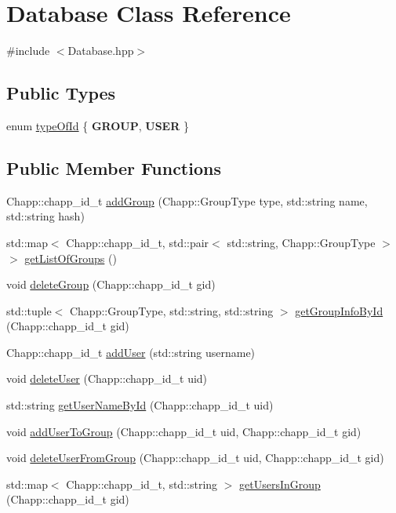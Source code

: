 \hypertarget{class_database}{}\section{Database Class Reference}
\label{class_database}


{\ttfamily \#include $<$Database.\+hpp$>$}

\subsection*{Public Types}
\begin{DoxyCompactItemize}
\item 
enum \hyperlink{class_database_ad32ccd24dab0b01d6d932b17a98a8695}{type\+Of\+Id} \{ {\bfseries G\+R\+O\+UP}, 
{\bfseries U\+S\+ER}
 \}
\end{DoxyCompactItemize}
\subsection*{Public Member Functions}
\begin{DoxyCompactItemize}
\item 
Chapp\+::chapp\+\_\+id\+\_\+t \hyperlink{class_database_a282bee9ff58e4c3e554552de4087f5ac}{add\+Group} (Chapp\+::\+Group\+Type type, std\+::string name, std\+::string hash)
\item 
std\+::map$<$ Chapp\+::chapp\+\_\+id\+\_\+t, std\+::pair$<$ std\+::string, Chapp\+::\+Group\+Type $>$ $>$ \hyperlink{class_database_a286f48b8af7fa66023c6aba1b3e73127}{get\+List\+Of\+Groups} ()
\item 
void \hyperlink{class_database_a680206c34e9a5ddebda18e05a3f82529}{delete\+Group} (Chapp\+::chapp\+\_\+id\+\_\+t gid)
\item 
std\+::tuple$<$ Chapp\+::\+Group\+Type, std\+::string, std\+::string $>$ \hyperlink{class_database_a5a5714804e40ee468b2e5f1bccf8dc69}{get\+Group\+Info\+By\+Id} (Chapp\+::chapp\+\_\+id\+\_\+t gid)
\item 
Chapp\+::chapp\+\_\+id\+\_\+t \hyperlink{class_database_ad55a1036c3276f4220f0f63f72b0dce2}{add\+User} (std\+::string username)
\item 
void \hyperlink{class_database_a1736f6c7fc8132b793568924e857bfe2}{delete\+User} (Chapp\+::chapp\+\_\+id\+\_\+t uid)
\item 
std\+::string \hyperlink{class_database_a11c428536c444314610396754abc07bb}{get\+User\+Name\+By\+Id} (Chapp\+::chapp\+\_\+id\+\_\+t uid)
\item 
void \hyperlink{class_database_a7ab1f3d3cb8d2ca36e4fb6d749974868}{add\+User\+To\+Group} (Chapp\+::chapp\+\_\+id\+\_\+t uid, Chapp\+::chapp\+\_\+id\+\_\+t gid)
\item 
void \hyperlink{class_database_a63af1a2a95bffd362f7d35746758d856}{delete\+User\+From\+Group} (Chapp\+::chapp\+\_\+id\+\_\+t uid, Chapp\+::chapp\+\_\+id\+\_\+t gid)
\item 
std\+::map$<$ Chapp\+::chapp\+\_\+id\+\_\+t, std\+::string $>$ \hyperlink{class_database_aa6ec358d0c6a35f9b5ee18f723d01f91}{get\+Users\+In\+Group} (Chapp\+::chapp\+\_\+id\+\_\+t gid)
\end{DoxyCompactItemize}
